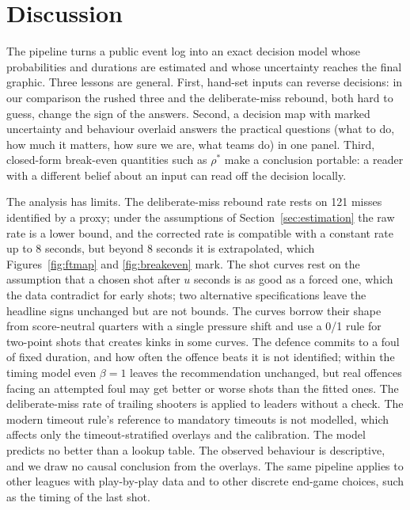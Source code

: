 \documentclass[article]{jdssv}
\begin{document}
\section{Discussion} \label{sec:discussion}

The pipeline turns a public event log into an exact decision model whose probabilities and durations are estimated and
whose uncertainty reaches the final graphic. Three lessons are general. First, hand-set inputs can reverse
decisions: in our comparison the rushed three and the deliberate-miss rebound, both hard to guess, change the
sign of the answers. Second, a decision map with marked uncertainty and behaviour overlaid answers the practical
questions (what to do, how much it matters, how sure we are, what teams do) in one panel. Third, closed-form
break-even quantities such as $\rho^{\ast}$ make a conclusion portable: a reader with a different belief about an
input can read off the decision locally.

The analysis has limits. The deliberate-miss rebound rate rests on 121 misses identified by a proxy; under the
assumptions of Section~\ref{sec:estimation} the raw rate is a lower bound, and the corrected rate is compatible with
a constant rate up to 8 seconds, but beyond 8 seconds it is extrapolated,
which Figures~\ref{fig:ftmap} and \ref{fig:breakeven} mark. The shot curves rest on the assumption that a chosen
shot after $u$ seconds is as good as a forced one, which the data contradict for early shots; two alternative
specifications leave the headline signs unchanged but are not bounds. The curves borrow their shape from score-neutral quarters with a
single pressure shift and use a 0/1 rule for two-point shots that creates kinks in some curves. The defence commits
to a foul of fixed duration, and how often the offence beats it is not identified; within the timing model even
$\beta=1$ leaves the recommendation unchanged, but real offences facing an attempted foul may get better or worse shots
than the fitted ones. The deliberate-miss rate of trailing shooters is applied to leaders without a check. The modern timeout rule's reference to mandatory timeouts is not modelled, which
affects only the timeout-stratified overlays and the calibration. The model predicts no better than a lookup
table. The observed behaviour is descriptive, and we draw no causal conclusion from the overlays. The same
pipeline applies to other leagues with play-by-play data and to other discrete end-game choices, such as the
timing of the last shot.
\end{document}
